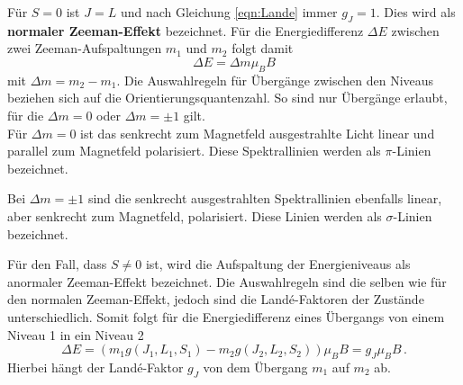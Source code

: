 Für $S=0$ ist $J=L$ und nach Gleichung \eqref{eqn:Lande} immer $g_J = 1$.
Dies wird als \textbf{normaler Zeeman-Effekt} bezeichnet.
Für die Energiedifferenz $\Delta E$ zwischen zwei Zeeman-Aufspaltungen $m_1$ und $m_2$ folgt damit
\begin{equation} \label{egn:E_normal}
  \Delta E = \Delta m \mu_B B
\end{equation}
mit $\Delta m  = m_2 - m_1$.
Die Auswahlregeln für Übergänge zwischen den Niveaus beziehen sich auf die Orientierungsquantenzahl.
So sind nur Übergänge erlaubt, für die $\Delta m = 0$ oder $\Delta m = \pm 1$ gilt. \\
Für $\Delta m = 0$ ist das senkrecht zum Magnetfeld ausgestrahlte Licht linear und parallel zum Magnetfeld polarisiert.
Diese Spektrallinien werden als $\pi$-Linien bezeichnet.
\par\medskip
Bei $\Delta m = \pm1$ sind die senkrecht ausgestrahlten Spektrallinien ebenfalls linear, aber senkrecht zum Magnetfeld, polarisiert.
Diese Linien werden als $\sigma$-Linien bezeichnet.

\par\bigskip

Für den Fall, dass $S \neq 0$ ist, wird die Aufspaltung der Energieniveaus als anormaler Zeeman-Effekt bezeichnet.
Die Auswahlregeln sind die selben wie für den normalen Zeeman-Effekt, jedoch sind die Landé-Faktoren der Zustände unterschiedlich.
Somit folgt für die Energiedifferenz eines Übergangs von einem Niveau 1 in ein Niveau 2
\begin{equation} \label{eqn:an_zeeman}
  \Delta E = \left( m_1 g\left(J_1,L_1,S_1\right) - m_2 g\left(J_2,L_2,S_2\right) \right) \mu_B B = g_J \mu_B B \, .
\end{equation}
Hierbei hängt der Landé-Faktor $g_J$ von dem Übergang $m_1$ auf $m_2$ ab.
